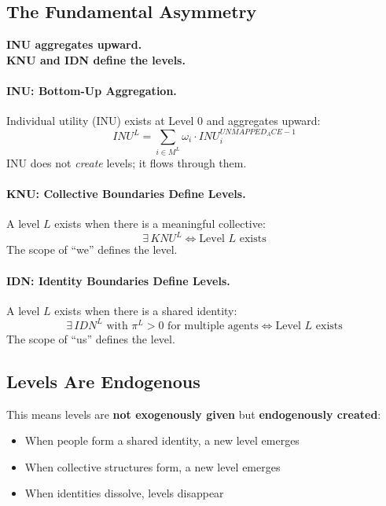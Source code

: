 \subsection{The Fundamental Asymmetry}

\begin{tcolorbox}[colback=blue!5!white, colframe=blue!50!black]
\textbf{INU aggregates upward.} \\
\textbf{KNU and IDN define the levels.}
\end{tcolorbox}

\paragraph{INU: Bottom-Up Aggregation.}
Individual utility (INU) exists at Level 0 and aggregates upward:
\begin{equation}
INU^L = \sum_{i \in M^L} \omega_i \cdot INU^{UNMAPPED_ACE-1}_i
\end{equation}
INU does not \emph{create} levels; it flows through them.

\paragraph{KNU: Collective Boundaries Define Levels.}
A level $L$ exists when there is a meaningful collective:
\begin{equation}
\exists \, KNU^L \iff \text{Level } L \text{ exists}
\end{equation}
The scope of ``we'' defines the level.

\paragraph{IDN: Identity Boundaries Define Levels.}
A level $L$ exists when there is a shared identity:
\begin{equation}
\exists \, IDN^L \text{ with } \pi^L > 0 \text{ for multiple agents} \iff \text{Level } L \text{ exists}
\end{equation}
The scope of ``us'' defines the level.

\subsection{Levels Are Endogenous}

This means levels are \textbf{not exogenously given} but \textbf{endogenously created}:
\begin{itemize}
\item When people form a shared identity, a new level emerges
\item When collective structures form, a new level emerges
\item When identities dissolve, levels disappear
\end{itemize}

